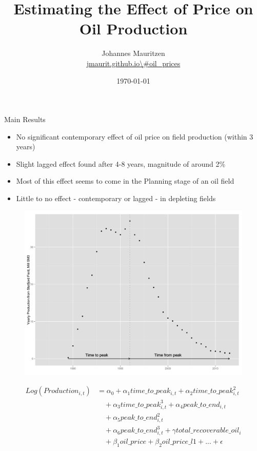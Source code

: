 \documentclass{beamer}
\title[Monte Carlo]{Estimating the Effect of Price on Oil Production}
\author[Andersoon and Mauritzen]{Johannes Mauritzen \\ \url{jmaurit.github.io\\#oil\_prices}}
\institute[NHH]{
}
\date{\today}
\begin{document}
\begin{frame}[plain]
  \titlepage
\end{frame}

\begin{frame}[plain]
	Main Results
	\begin{itemize}
		\item No significant contemporary effect of oil price on field production (within 3 years)
		\item Slight lagged effect found after 4-8 years, magnitude of around 2\%
		\item Most of this effect seems to come in the Planning stage of an oil field
		\item Little to no effect - contemporary or lagged - in depleting fields
	\end{itemize}
\end{frame}

\begin{figure}
	\includegraphics[width=1\textwidth]{figures/statfjord_dem_print.png}
	\label{statfjord_dem}
\end{figure}

\begin{frame}[plain]
	\begin{equation}
		\begin{split}
		 Log(Production_{i,t}) & = \alpha_0 + \alpha_1 time\_to\_peak_{i,t} + \alpha_2 time\_to\_peak_{i,t}^2 \\
		& \quad + \alpha_3 time\_to\_peak_{i,t}^3  + \alpha_4 peak\_to\_end_{i,t} \\
		& \quad + \alpha_5 peak\_to\_end_{i,t}^2 \\
		& \quad + \alpha_6 peak\_to\_end_{i,t}^3 + \gamma total\_recoverable\_oil_i \\
		& \quad + \beta_1 oil\_price + \beta_2 oil\_price\_l1 + ...+ \epsilon
		\end{split}
	\label{glm_eqn}
		\end{equation}
\end{frame}
\end{document}
